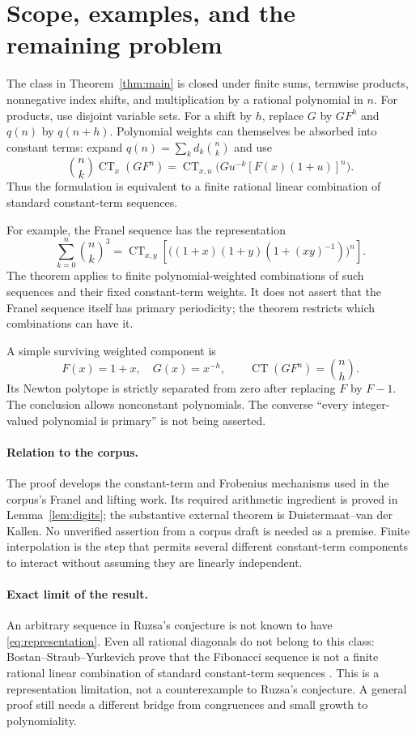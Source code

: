 \documentclass[11pt,a4paper]{article}
\theoremstyle{remark}\newtheorem{remark}[theorem]{Remark}
\newcommand{\CT}{\operatorname{CT}}
\begin{document}
\section{Scope, examples, and the remaining problem}

The class in Theorem~\ref{thm:main} is closed under finite sums, termwise
products, nonnegative index shifts, and multiplication by a rational
polynomial in $n$. For products, use disjoint variable sets. For a shift by
$h$, replace $G$ by $GF^h$ and $q(n)$ by $q(n+h)$.
Polynomial weights can themselves be absorbed
into constant terms: expand $q(n)=\sum_k d_k\binom nk$ and use
\[
 \binom nk\CT_x(GF^n)
 =\CT_{x,u}\bigl(G u^{-k}[F(x)(1+u)]^n\bigr).
\]
Thus the formulation is equivalent to a finite rational linear combination
of standard constant-term sequences.

For example, the Franel sequence has the representation
\[
 \sum_{k=0}^n\binom nk^3
 =\CT_{x,y}\!\left[\bigl((1+x)(1+y)(1+(xy)^{-1})\bigr)^n\right].
\]
The theorem applies to finite polynomial-weighted combinations of such
sequences and their fixed constant-term weights. It does not assert that
the Franel sequence itself has primary periodicity; the theorem restricts
which combinations can have it.

A simple surviving weighted component is
\[
 F(x)=1+x,\quad G(x)=x^{-h},\qquad
 \CT(GF^n)=\binom nh.
\]
Its Newton polytope is strictly separated from zero after replacing $F$ by
$F-1$. The conclusion allows nonconstant polynomials. The converse
``every integer-valued polynomial is primary'' is not being asserted.

\paragraph{Relation to the corpus.}
The proof develops the constant-term and Frobenius mechanisms used in the
corpus's Franel and lifting work. Its required arithmetic ingredient is
proved in Lemma~\ref{lem:digits}; the substantive external theorem is
Duistermaat--van der Kallen. No unverified assertion from a corpus draft is
needed as a premise. Finite interpolation is the step that permits several
different constant-term components to interact without assuming they are
linearly independent.

\paragraph{Exact limit of the result.}
An arbitrary sequence in Ruzsa's conjecture is not known to have
\eqref{eq:representation}. Even all rational diagonals do not belong to this
class: Bostan--Straub--Yurkevich prove that the Fibonacci sequence is not a
finite rational linear combination of standard constant-term sequences
\cite{BSY}. This is a representation limitation,
not a counterexample to Ruzsa's conjecture. A general proof still needs a
different bridge from congruences and small growth to polynomiality.
\end{document}
